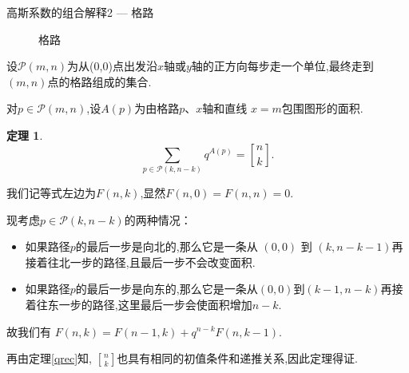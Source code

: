 \documentclass[punct]{ctexbeamer}
\newtheorem{thm}{定理}[section]
\def\pf{\noindent {\bf 证明\ }}
\begin{document}
\begin{frame}{高斯系数的组合解释2 --- 格路}
\begin{minipage}{0.2\linewidth}
\begin{figure}
            \caption{格路}
        \end{figure}
    \end{minipage}
\end{frame}

\begin{frame}
    设$\mathscr{P}(m,n)$为从(0,0)点出发沿$x$轴或$y$轴的正方向每步走一个单位,最终走到$(m,n)$点的格路组成的集合.

    对$p \in \mathscr{P}(m,n)$,设$A(p)$为由格路$p$、$x$轴和直线 $x=m$包围图形的面积.
    \begin{thm}
        $$\sum_{p \in \mathscr{P}(k,n-k)} q^{A(p)} = {n\brack k}.$$
    \end{thm}
    \pause
    \pf
    我们记等式左边为$F(n,k)$,显然$F(n,0)=F(n,n)=0$.

    现考虑$p \in \mathscr{P}(k,n-k)$的两种情况：
    \begin{itemize}
        \item 如果路径$p$的最后一步是向北的,那么它是一条从 $(0,0)$ 到 $(k, n-k-1)$再接着往北一步的路径,且最后一步不会改变面积.

        \item 如果路径$p$的最后一步是向东的,那么它是一条从$(0,0)$到$(k-1, n-k)$再接着往东一步的路径,这里最后一步会使面积增加$n-k$.
    \end{itemize}

    故我们有
    $
    F(n,k)=F(n-1,k)+q^{n-k} F(n,k-1)
    $.

    再由定理\ref{qrec}知, $ {n\brack k}$也具有相同的初值条件和递推关系,因此定理得证.
\end{frame}
\end{document}

